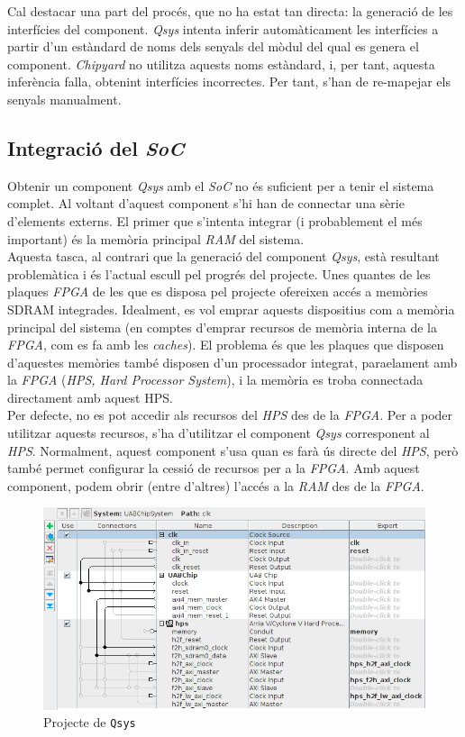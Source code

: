 \documentclass{article}
\begin{document}
Cal destacar una part del procés, que no ha estat tan directa: la generació de les interfícies del component. \textit{Qsys} intenta inferir automàticament les interfícies a partir d'un estàndard de noms dels senyals del mòdul del qual es genera el component. \textit{Chipyard} no utilitza aquests noms estàndard, i, per tant, aquesta inferència falla, obtenint interfícies incorrectes. Per tant, s'han de re-mapejar els senyals manualment.

\subsection{Integració del \textit{SoC}}

Obtenir un component \textit{Qsys} amb el \textit{SoC} no és suficient per a tenir el sistema complet. Al voltant d'aquest component s'hi han de connectar una sèrie d'elements externs.
El primer que s'intenta integrar (i probablement el més important) és la memòria principal \textit{RAM} del sistema.
\\

Aquesta tasca, al contrari que la generació del component \textit{Qsys}, està resultant problemàtica i és l'actual escull pel progrés del projecte.
Unes quantes de les plaques \textit{FPGA} de les que es disposa pel projecte ofereixen accés a memòries SDRAM integrades. Idealment, es vol emprar aquests dispositius com a memòria principal del sistema (en comptes d'emprar recursos de memòria interna de la \textit{FPGA}, com es fa amb les \textit{caches}).
El problema és que les plaques que disposen d'aquestes memòries també disposen d'un processador integrat, para\lgem elament amb la \textit{FPGA} (\textit{HPS, Hard Processor System}), i la memòria es troba connectada directament amb aquest HPS.
\\

Per defecte, no es pot accedir als recursos del \textit{HPS} des de la \textit{FPGA}. Per a poder utilitzar aquests recursos, s'ha d'utilitzar el component \textit{Qsys} corresponent al \textit{HPS}. Normalment, aquest component s'usa quan es farà ús directe del \textit{HPS}, però també permet configurar la cessió de recursos per a la \textit{FPGA}. Amb aquest component, podem obrir (entre d'altres) l'accés a la \textit{RAM} des de la \textit{FPGA}.

\begin{figure}[h]
\centering
\includegraphics[width=15cm]{Qsys.png}
\caption{Projecte de \texttt{Qsys}}
\label{fig:qsys}
\end{figure}
\end{document}
